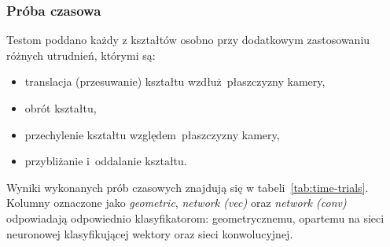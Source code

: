 \documentclass[11pt,a4paper]{article}
\begin{document}
\subsubsection{Próba czasowa}

Testom poddano każdy z kształtów osobno przy dodatkowym zastosowaniu różnych utrudnień, którymi są:
\begin{itemize}
    \item translacja (przesuwanie) kształtu wzdłuż~płaszczyzny kamery,
    \item obrót kształtu,
    \item przechylenie kształtu względem~płaszczyzny kamery,
    \item przybliżanie i~oddalanie kształtu.
\end{itemize}

Wyniki wykonanych prób czasowych znajdują się w tabeli~\ref{tab:time-trials}. Kolumny oznaczone jako \emph{geometric}, \emph{network (vec)} oraz \emph{network (conv)} odpowiadają odpowiednio klasyfikatorom: geometrycznemu, opartemu na sieci neuronowej klasyfikującej wektory oraz sieci konwolucyjnej.
\end{document}
